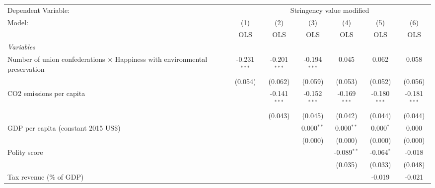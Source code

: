 
\begingroup
\centering
\begin{tabular}{lcccccc}
   \toprule
   Dependent Variable: & \multicolumn{6}{c}{Stringency value modified}\\
   Model:                                                                             & (1)            & (2)            & (3)            & (4)            & (5)            & (6)\\  
                                                                                      &  OLS           & OLS            & OLS            & OLS            & OLS            & OLS\\  
   \midrule
   \emph{Variables}\\
   Number of union confederations $\times$ Happiness with environmental preservation  & -0.231$^{***}$ & -0.201$^{***}$ & -0.194$^{***}$ & 0.045          & 0.062          & 0.058\\   
                                                                                      & (0.054)        & (0.062)        & (0.059)        & (0.053)        & (0.052)        & (0.056)\\   
   CO2 emissions per capita                                                           &                & -0.141$^{***}$ & -0.152$^{***}$ & -0.169$^{***}$ & -0.180$^{***}$ & -0.181$^{***}$\\   
                                                                                      &                & (0.043)        & (0.045)        & (0.042)        & (0.044)        & (0.044)\\   
   GDP per capita (constant 2015 US\$)                                                &                &                & 0.000$^{**}$   & 0.000$^{**}$   & 0.000$^{*}$    & 0.000\\   
                                                                                      &                &                & (0.000)        & (0.000)        & (0.000)        & (0.000)\\   
   Polity score                                                                       &                &                &                & -0.089$^{**}$  & -0.064$^{*}$   & -0.018\\   
                                                                                      &                &                &                & (0.035)        & (0.033)        & (0.048)\\   
   Tax revenue (\% of GDP)                                                            &                &                &                &                & -0.019         & -0.021\\   

\end{tabular}
